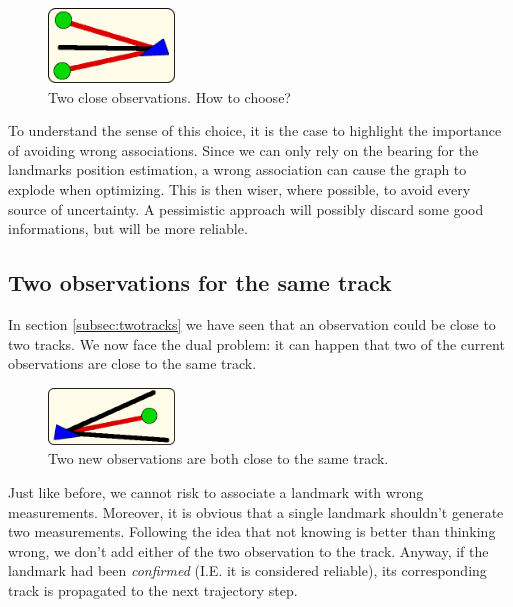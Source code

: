 \begin{figure}[htbp]
  \centering
    \includegraphics[width=0.3\textwidth]{images/uncertainty1.png}
  \caption{Two close observations. How to choose?}
  \label{fig:uncertainty1}
\end{figure}

To understand the sense of this choice, it is the case to highlight the importance of avoiding wrong associations.
Since we can only rely on the bearing for the landmarks position estimation, a wrong association can cause the graph to explode when optimizing.
This is then wiser, where possible, to avoid every source of uncertainty.
A pessimistic approach will possibly discard some good informations, but will be more reliable.

\subsection{Two observations for the same track}\label{subsec:twoobservations}
In section \ref{subsec:twotracks} we have seen that an observation could be close to two tracks.
We now face the dual problem: it can happen that two of the current observations are close to the same track.

\begin{figure}[htbp]
  \centering
    \includegraphics[width=0.3\textwidth]{images/uncertainty2.png}
  \caption{Two new observations are both close to the same track.}
  \label{fig:uncertainty2}
\end{figure}

Just like before, we cannot risk to associate a landmark with wrong measurements.
Moreover, it is obvious that a single landmark shouldn't generate two measurements.
Following the idea that not knowing is better than thinking wrong, we don't add either of the two observation to the track.
Anyway, if the landmark had been \textit{confirmed} (I.E. it is considered reliable), its corresponding track  is propagated to the next trajectory step.


